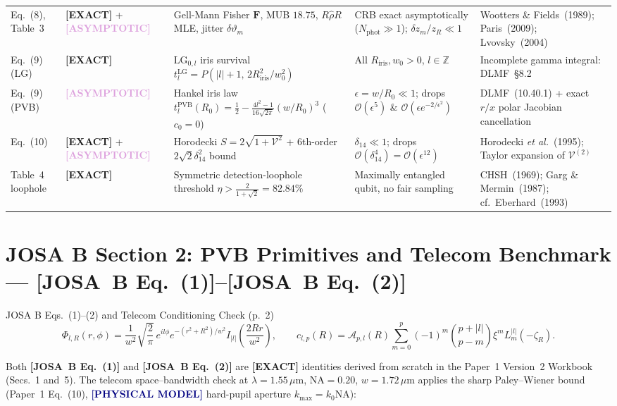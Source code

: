 \documentclass[10pt,letterpaper]{article}
\newcommand{\abs}[1]{\lvert #1 \rvert}
\newcommand{\josb}[1]{\textbf{[JOSA~B Eq.~(#1)]}}
\newcommand{\tagexact}{\textcolor{forest}{\textbf{[EXACT]}}}
\newcommand{\tagmodel}{\textcolor{navy}{\textbf{[PHYSICAL MODEL]}}}
\newcommand{\tagasymp}{\textcolor{plum}{\textbf{[ASYMPTOTIC]}}}
\numberwithin{equation}{section}
\begin{document}
\begin{center}
\begin{longtable}{@{}p{1.5cm}p{2.05cm}p{4.3cm}p{3.6cm}p{4.1cm}@{}}
Eq.~(8), Table~3 & \tagexact{} + \tagasymp{} & Gell-Mann Fisher $\mathbf{F}$, MUB $18.75$, $R\hat{\rho}R$ MLE, jitter $\delta\vartheta_m$ & CRB exact asymptotically ($N_{\mathrm{phot}} \gg 1$); $\delta z_m/z_R \ll 1$ & Wootters \& Fields~(1989); Paris~(2009); Lvovsky~(2004) \\
Eq.~(9) (LG) & \tagexact{} & $\mathrm{LG}_{0,l}$ iris survival $t_l^{\mathrm{LG}} = P(\abs{l}+1,\,2R_{\mathrm{iris}}^2/w_0^2)$ & All $R_{\mathrm{iris}}, w_0 > 0$, $l \in \mathbb{Z}$ & Incomplete gamma integral: DLMF~\S8.2 \\
Eq.~(9) (PVB) & \tagasymp{} & Hankel iris law $t_l^{\mathrm{PVB}}(R_0) = \frac{1}{2} - \frac{4l^2-1}{16\sqrt{2\pi}}(w/R_0)^3$ ($c_0=0$) & $\epsilon = w/R_0 \ll 1$; drops $\mathcal{O}(\epsilon^5)$ \& $\mathcal{O}(\epsilon e^{-2/\epsilon^2})$ & DLMF~(10.40.1) + exact $r/x$ polar Jacobian cancellation \\
Eq.~(10) & \tagexact{} + \tagasymp{} & Horodecki $S = 2\sqrt{1+\mathcal{V}^2}$ + 6th-order $2\sqrt{2}\delta_{14}^2$ bound & $\delta_{14} \ll 1$; drops $\mathcal{O}(\delta_{14}^4) = \mathcal{O}(\epsilon^{12})$ & Horodecki \emph{et al.}~(1995); Taylor expansion of $\mathcal{V}^{(2)}$ \\
Table~4 loophole & \tagexact{} & Symmetric detection-loophole threshold $\eta > \frac{2}{1+\sqrt{2}} = 82.84\%$ & Maximally entangled qubit, no fair sampling & CHSH~(1969); Garg \& Mermin~(1987); cf.\ Eberhard~(1993) \\
\end{longtable}
\end{center}

\section{JOSA B Section 2: PVB Primitives and Telecom Benchmark --- \josb{1}--\josb{2}}
\label{sec:v2_b2}

\begin{targeteq}{JOSA B Eqs.~(1)--(2) and Telecom Conditioning Check (p.~2)}
\[
  \Phi_{l,R}(r,\phi) = \frac{1}{w^2}\sqrt{\frac{2}{\pi}}\,e^{il\phi}e^{-(r^2+R^2)/w^2} I_{\abs{l}}\!\left(\frac{2Rr}{w^2}\right), \qquad
  c_{l,p}(R) = \mathcal{A}_{p,l}(R)\sum_{m=0}^p (-1)^m\binom{p+\abs{l}}{p-m}\xi^m L_m^{\abs{l}}(-\zeta_R).
\]
\end{targeteq}

Both \josb{1} and \josb{2} are \tagexact{} identities derived from scratch in the Paper~1 Version~2 Workbook (Secs.~1 and~5). The telecom space--bandwidth check at $\lambda = 1.55\,\mu\mathrm{m}$, $\mathrm{NA} = 0.20$, $w = 1.72\,\mu\mathrm{m}$ applies the sharp Paley--Wiener bound (Paper~1 Eq.~(10), \tagmodel{} hard-pupil aperture $k_{\max} = k_0\mathrm{NA}$):
\end{document}
